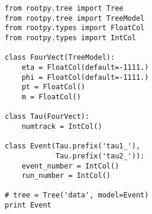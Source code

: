 \begin{footnotesize}
\begin{verbatim}
from rootpy.tree import Tree
from rootpy.tree import TreeModel
from rootpy.types import FloatCol
from rootpy.types import IntCol

class FourVect(TreeModel):
    eta = FloatCol(default=-1111.)
    phi = FloatCol(default=-1111.)
    pt = FloatCol()
    m = FloatCol()

class Tau(FourVect):
    numtrack = IntCol()

class Event(Tau.prefix('tau1_'),
            Tau.prefix('tau2_')):
    event_number = IntCol()
    run_number = IntCol()

# tree = Tree('data', model=Event)
print Event
\end{verbatim}
\end{footnotesize}
